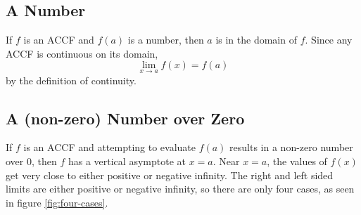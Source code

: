 \subsection{A Number}

If $f$ is an ACCF and $f(a)$ is a number, then $a$ is in the domain of $f$. Since any ACCF is continuous on its domain,
$$\lim_{x\to a}f(x)=f(a)$$
by the definition of continuity. 

\subsection{A (non-zero) Number over Zero}

If $f$ is an ACCF and attempting to evaluate $f(a)$ results in a non-zero number over 0, then $f$ has a vertical asymptote at $x=a$. Near $x=a$, the values of $f(x)$ get very close to either positive or negative infinity. The right and left sided limits are either positive or negative infinity, so there are only four cases, as seen in figure \ref{fig:four-cases}.


